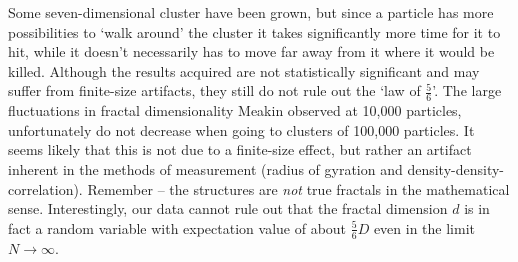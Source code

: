 \documentclass[twocolumn, 10pt]{scrartcl}
\begin{document}
                Some seven-dimensional cluster have been grown, but since a particle has more possibilities to `walk
                around' the cluster it takes significantly more time for it to hit, while it doesn't necessarily has to
                move far away from it where it would be killed. Although the results acquired are not statistically
                significant and may suffer from finite-size artifacts, they still do not rule out the `law of $\frac{5}{6}$'.
                The large fluctuations in fractal dimensionality Meakin observed at 10,000 particles, unfortunately
                do not decrease when going to clusters of 100,000 particles. It seems likely that this is not due to
                a finite-size effect, but rather an artifact inherent in the methods of measurement (radius of gyration
                and density-density-correlation). Remember -- the structures are \emph{not} true fractals in the
                mathematical sense. Interestingly, our data cannot rule out that the fractal dimension $d$ is in fact
                a random variable with expectation value of about $\frac{5}{6}D$ even in the limit
                $N\rightarrow\infty$.
\end{document}
